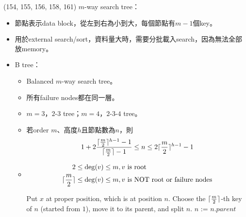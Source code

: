 \item \begin{theorem}{(154, 155, 156, 158, 161)} $m$-way search tree： \label{m-wayst}\begin{itemize}
        \item 節點表示data block，從左到右為小到大，每個節點有$m - 1$個key。
        \item 用於external search/sort，資料量大時，需要分批載入search，因為無法全部放memory。
        \item B tree：\begin{itemize}
            \item Balanced $m$-way search tree。
            \item 所有failure nodes都在同一層。
            \item $m = 3$，$2$-$3$ tree；$m = 4$，$2$-$3$-$4$ tree。
            \item 若order $m$、高度$h$且節點數為$n$，則\begin{equation}
                1 + 2\frac{\lceil\frac{m}{2}\rceil^{h - 1} - 1}{\lceil\frac{m}{2}\rceil - 1} \le n \le 2\lceil\frac{m}{2}\rceil^{h - 1} - 1
            \end{equation}
            \item \begin{equation}
                \begin{aligned}
                    2 \le \deg(v) \le m &, v \ \text{is root} \\
                    \ceil{\frac{m}{2}} \le \deg(v) \le m &, v \ \text{is NOT root or failure nodes}
                \end{aligned}
            \end{equation}
            \begin{algorithm}[H]
                \begin{algorithmic}[1]
                        \State Put $x$ at proper position, which is at position $n$.
                            \State Choose the $\lceil\frac{m}{2}\rceil$-th key of $n$ (started from $1$), move it to its parent, and split $n$.
                            \State $n$ := $n.parent$
                        \EndWhile
                    \EndFunction
                \end{algorithmic}
            \end{algorithm}
            \begin{algorithm}[H]
                \begin{algorithmic}[1]

\end{algorithmic}
\end{algorithm}
\end{itemize}
\end{itemize}
\end{theorem}
